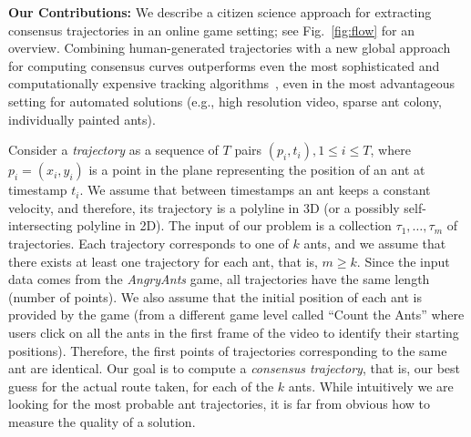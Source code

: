 \documentclass{llncs}
\begin{document}
{\bf Our Contributions:}
We describe a citizen science approach for extracting
consensus trajectories in an online game setting; see
Fig.~\ref{fig:flow} for an overview.
Combining human-generated trajectories with a new global approach for
computing consensus curves outperforms
even the most sophisticated and computationally expensive tracking algorithms~\cite{Poff12}, even in the
most advantageous setting for automated solutions (e.g., high
resolution video, sparse ant colony, individually painted ants).

Consider a {\em trajectory} as a sequence of
$T$ pairs $(p_i,t_i), 1 \le i \le T$, where $p_i=(x_i, y_i)$ is a
point in the plane representing the position of an ant at timestamp $t_i$.
We assume that between timestamps an ant keeps a constant
velocity, and therefore, its trajectory is a polyline in 3D (or a possibly
self-intersecting polyline in 2D).
The input of our problem is a collection $\tau_1, \dots, \tau_m$ of
trajectories. Each trajectory corresponds to one of $k$ ants, and we
assume that there exists at least one trajectory for each ant, that
is, $m\ge k$. Since the input data comes from the \emph{AngryAnts} game, all
trajectories have the same length (number of points).
We also assume that the initial position of each ant is provided by
the game (from a different game level called ``Count the Ants'' where
users click on all the ants in the first frame of the video to identify their starting
positions). Therefore, the first points of trajectories corresponding
to the same ant are identical. Our goal is to compute a {\em consensus
trajectory}, that is, our best guess for the actual route taken, for
each of the $k$ ants. While intuitively we are looking for the most probable ant trajectories,
it is far from obvious how to measure the quality of a solution.
\end{document}
